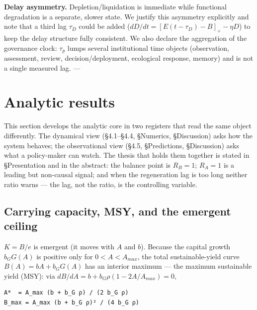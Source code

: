\documentclass[11pt]{article}
\begin{document}
\textbf{Delay asymmetry.} Depletion/liquidation is immediate while functional degradation is a separate, slower state. We justify this asymmetry explicitly and note that a third lag $\tau{}_{D}$ could be added ($dD/dt = [E(t-\tau{}_{D}) - B]_{+} - \eta{}D$) to keep the delay structure fully consistent. We also declare the aggregation of the governance clock: $\tau{}_{p}$ lumps several institutional time objects (observation, assessment, review, decision/deployment, ecological response, memory) and is not a single measured lag. ---

\section{Analytic results}

This section develops the analytic core in two registers that read the same object differently. The dynamical view (§4.1–§4.4, §Numerics, §Discussion) asks how the system behaves; the observational view (§4.5, §Predictions, §Discussion) asks what a policy-maker can watch. The thesis that holds them together is stated in §Presentation and in the abstract: the balance point is $R_{B} = 1$; $R_{A} = 1$ is a leading but non-causal signal; and when the regeneration lag is too long neither ratio warns — the lag, not the ratio, is the controlling variable.

\subsection{Carrying capacity, MSY, and the emergent ceiling}

$K = B/e$ is emergent (it moves with $A$ and $b$). Because the capital growth $b_{G} G(A)$ is positive only for $0 < A < A_{max}$, the total sustainable-yield curve $B(A) = bA + b_{G} G(A)$ has an interior maximum — the maximum sustainable yield (MSY): via $dB/dA = b + b_{G} \rho{}(1 - 2A/A_{max}) = 0$,

\begingroup\small\begin{verbatim}
A*  = A_max (b + b_G ρ) / (2 b_G ρ)
B_max = A_max (b + b_G ρ)² / (4 b_G ρ)
\end{verbatim}\endgroup
\end{document}
